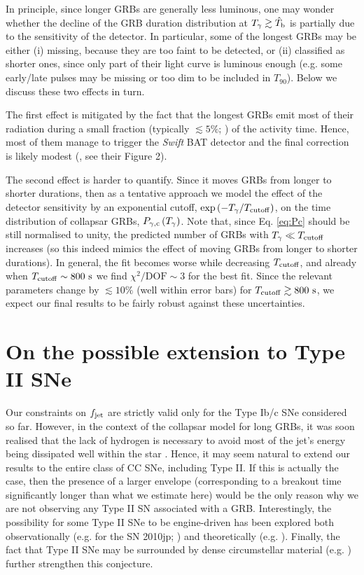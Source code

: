 \documentclass[useAMS,usenatbib]{mn2e}
\begin{document}
In principle, since longer GRBs are generally less luminous, one may wonder whether the decline of the GRB duration distribution at $T_\gamma\gtrsim \hat{T}_{\rm b}$ is partially due to the sensitivity of the detector.
In particular, some of the longest GRBs may be either (i) missing, because they are too faint to be detected, or (ii) classified as shorter ones, since only part of their light curve is luminous enough (e.g. some early/late pulses may be missing or too dim to be included in $T_{90}$). Below we discuss these two effects in turn.

The first effect is mitigated by the fact that the longest GRBs emit most of their radiation during a small fraction (typically $\lesssim 5\%$; \citealt{Butler2010}) of the activity time. Hence, most of them manage to trigger the {\it Swift} BAT detector and the final correction is likely modest (\citealt{Butler2010}, see their Figure 2).

The second effect is harder to quantify. Since it moves GRBs from longer to shorter durations, then as a tentative approach we model the effect of the detector sensitivity by an exponential cutoff, $\exp\left(-T_\gamma/T_{\rm cutoff}\right)$, on the time distribution of collapsar GRBs, $P_{\rm \gamma,c}\left(T_\gamma\right)$. Note that, since Eq. \eqref{eq:Pc} should be still normalised to unity, the predicted number of GRBs with $T_\gamma\ll T_{\rm cutoff}$ increases (so this indeed mimics the effect of moving GRBs from longer to shorter durations). In general, the fit becomes worse while decreasing $T_{\rm cutoff}$, and already when $T_{\rm cutoff}\sim 800\text{ s}$ we find $\chi^2/\text{DOF}\sim 3$ for the best fit. Since the relevant parameters change by $\lesssim 10\%$ (well within error bars) for $T_{\rm cutoff}\gtrsim 800\text{ s}$, we expect our final results to be fairly robust against these uncertainties.


\section{On the possible extension to Type II SN\MakeLowercase{e}}
\label{sec:typeII}

Our constraints on $f_{\rm jet}$ are strictly valid only for the Type Ib/c SNe considered so far. However, in the context of the collapsar model for long GRBs, it was soon realised that the lack of hydrogen is necessary to avoid most of the jet's energy being dissipated well within the star \citep{MacfadyenWoosley1999}. Hence, it may seem natural to extend our results to the entire class of CC SNe, including Type II. If this is actually the case, then the presence of a larger envelope (corresponding to a breakout time significantly longer than what we estimate here) would be the only reason why we are not observing any Type II SN associated with a GRB. Interestingly, the possibility for some Type II SNe to be engine-driven has been explored both observationally (e.g. for the SN 2010jp; \citealt{Smith2012}) and theoretically (e.g. \citealt{Chevalier2012}). Finally, the fact that Type II SNe may be surrounded by dense circumstellar material (e.g. \citealt{Yaron2017}) further strengthen this conjecture.
\end{document}

